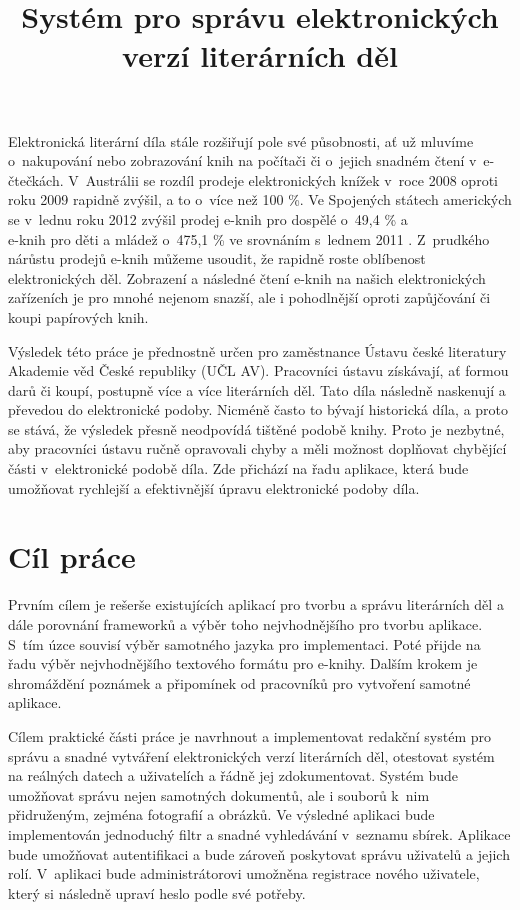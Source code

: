 \documentclass[thesis=B,czech]{FITthesis}[2012/06/26]
\title{Systém pro správu elektronických verzí literárních děl}
\begin{document}

\begin{introduction}

    Elektronická literární díla stále rozšiřují pole své působnosti, ať už mluvíme o~nakupování nebo zobrazování knih na počítači či o~jejich snadném čtení v~e-čtečkách. V~Austrálii se rozdíl prodeje elektronických knížek v~roce 2008 oproti roku 2009 rapidně zvýšil, a to o~více než 100 \%. Ve Spojených státech amerických se v~lednu roku 2012 zvýšil prodej e-knih pro dospělé o~49,4 \% a\\ e-knih pro děti a mládež o~475,1 \% ve srovnáním s~lednem 2011 \cite{info}. Z~prudkého nárůstu prodejů e-knih můžeme usoudit, že rapidně roste oblíbenost elektronických děl. Zobrazení a následné čtení e-knih na našich elektronických zařízeních je pro mnohé nejenom snazší, ale i pohodlnější oproti zapůjčování či koupi papírových knih.

	Výsledek této práce je přednostně určen pro zaměstnance Ústavu české literatury Akademie věd České republiky (UČL AV). Pracovníci ústavu získávají, ať formou darů či koupí, postupně více a více literárních děl. Tato díla následně naskenují a převedou do elektronické podoby. Nicméně často to bývají historická díla, a proto se stává, že výsledek přesně neodpovídá tištěné podobě knihy. Proto je nezbytné, aby pracovníci ústavu ručně opravovali chyby a měli možnost doplňovat chybějící části v~elektronické podobě díla. Zde přichází na řadu aplikace, která bude umožňovat rychlejší a efektivnější úpravu elektronické podoby díla.

    \section{Cíl práce}
    
        Prvním cílem je rešerše existujících aplikací pro tvorbu a správu literárních děl a dále porovnání frameworků a výběr toho nejvhodnějšího pro tvorbu aplikace. S~tím úzce souvisí výběr samotného jazyka pro implementaci. Poté přijde na řadu  výběr nejvhodnějšího textového formátu pro e-knihy. Dalším krokem je shromáždění poznámek a připomínek od pracovníků pro vytvoření samotné aplikace.
    
        Cílem praktické části práce je navrhnout a implementovat redakční systém pro správu a snadné vytváření elektronických verzí literárních děl, otestovat systém na reálných datech a uživatelích a řádně jej zdokumentovat. Systém bude umožňovat správu nejen samotných dokumentů, ale i souborů k~nim přidruženým, zejména fotografií a obrázků. Ve výsledné aplikaci bude implementován jednoduchý filtr a snadné vyhledávání v~seznamu sbírek. Aplikace bude umožňovat autentifikaci a bude zároveň poskytovat správu uživatelů a jejich rolí. V~aplikaci bude administrátorovi umožněna registrace nového uživatele, který si následně upraví heslo podle své potřeby.
        

\end{introduction}
\end{document}
